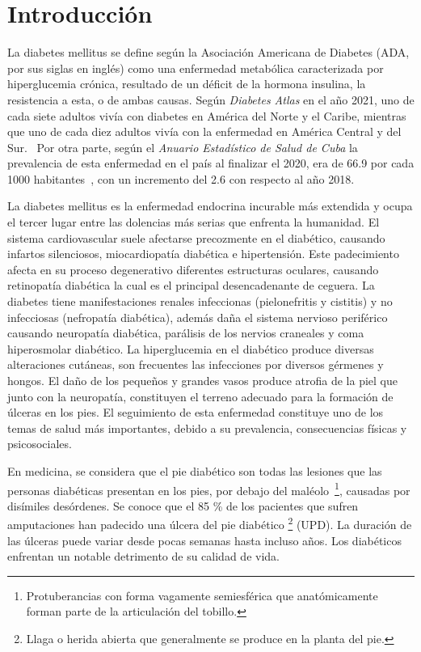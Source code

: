 \chapter*{Introducción}\label{chapter:introduction}

La diabetes mellitus se define según la Asociación Americana de Diabetes (ADA, por sus siglas en inglés) como una enfermedad metabólica caracterizada por hiperglucemia crónica, resultado de un déficit de la hormona insulina, la resistencia a esta, o de ambas causas. Según \textit{Diabetes Atlas} en el año 2021, uno de cada siete adultos vivía con diabetes en América del Norte y el Caribe, mientras que uno de cada diez adultos vivía con la enfermedad en América Central y del Sur.~\cite{diabetesAtlas} Por otra parte, según el \textit{Anuario Estadístico de Salud de Cuba} la prevalencia de esta enfermedad en el país al finalizar el 2020, era de 66.9 por cada 1000 habitantes~\cite{anuario2020}, con un incremento del 2.6 con respecto al año 2018.~\cite{anuario2018}

La diabetes mellitus es la enfermedad endocrina incurable más extendida y ocupa el tercer lugar entre las dolencias más serias que enfrenta la humanidad. El sistema cardiovascular suele afectarse precozmente en el diabético, causando infartos silenciosos, miocardiopatía diabética e hipertensión. Este padecimiento afecta en su proceso degenerativo diferentes estructuras oculares, causando retinopatía diabética la cual es el principal desencadenante de ceguera. La diabetes tiene manifestaciones renales infeccionas (pielonefritis y cistitis) y no infecciosas (nefropatía diabética), además daña el sistema nervioso periférico causando neuropatía diabética, parálisis de los nervios craneales y coma hiperosmolar diabético. La hiperglucemia en el diabético produce diversas alteraciones cutáneas, son frecuentes las infecciones por diversos gérmenes y hongos. El daño de los pequeños y grandes vasos produce atrofia de la piel que junto con la neuropatía, constituyen el terreno adecuado para la formación de úlceras en los pies. El seguimiento de esta enfermedad constituye uno de los temas de salud más importantes, debido a su prevalencia, consecuencias físicas y psicosociales.~\cite{roca}

En medicina, se considera que el pie diabético son todas las lesiones que las personas diabéticas presentan en los pies, por debajo del maléolo~\footnote{Protuberancias con forma vagamente semiesférica que anatómicamente forman parte de la articulación del tobillo.}, causadas por disímiles desórdenes. Se conoce que el 85 \% de los pacientes que sufren amputaciones han padecido una úlcera del pie diabético \footnote{Llaga o herida abierta que generalmente se produce en la planta del pie.} (UPD). La duración de las úlceras puede variar desde pocas semanas hasta incluso años. Los diabéticos enfrentan un notable detrimento de su calidad de vida. 


